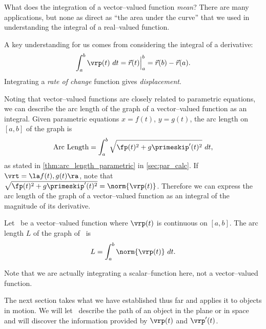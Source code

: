 What does the integration of a vector--valued function \emph{mean}? There are many applications, but none as direct as ``the area under the curve'' that we used in understanding the integral of a real--valued function.

A key understanding for us comes from considering the integral of a derivative: $$\int_a^b \vrp(t)\ dt = \vec r(t)\Big|_a^b = \vec r(b)-\vec r(a).$$ Integrating a \emph{rate of change} function gives \emph{displacement}.

Noting that vector--valued functions are closely related to parametric equations, we can describe the arc length of the graph of a vector--valued function as an integral. Given parametric equations $x=f(t)$, $y=g(t)$, the arc length on $[a,b]$ of the graph is
$$\text{Arc Length} = \int_a^b\sqrt{\fp(t)^2+g\primeskip'(t)^2}\ dt,$$
as stated in \autoref{thm:arc_length_parametric} in \autoref{sec:par_calc}. If $\vrt = \la f(t), g(t)\ra$, note that $\sqrt{\fp(t)^2+g\primeskip'(t)^2} = \norm{\vrp(t)}$. Therefore we can express the arc length of the graph of a vector--valued function as an integral of the magnitude of its derivative.

{Let \vrt\ be a vector--valued function where $\vrp(t)$ is continuous on $[a,b]$. The arc length $L$ of the graph of \vrt\ is 
$$L = \int_a^b \norm{\vrp(t)}\ dt.$$}

Note that we are actually integrating a scalar--function here, not a vector--valued function.

The next section takes what we have established thus far and applies it to objects in motion. We will let \vrt\ describe the path of an object in the plane or in space and will discover the information provided by $\vrp(t)$ and $\vrp'(t)$.

